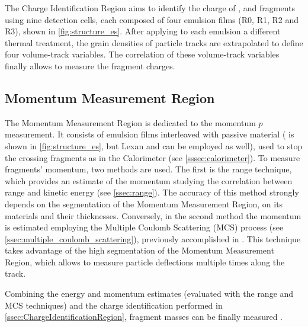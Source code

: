 The Charge Identification Region aims to identify the charge of ,  and  fragments using nine detection cells, each composed of four emulsion films (R0, R1, R2 and R3), shown in \autoref{fig:structure_es}. After applying to each emulsion a different thermal treatment, the grain densities of particle tracks are extrapolated to define four volume-track variables. The correlation of these volume-track variables finally allows to measure the fragment charges.
\subsection{Momentum Measurement Region}\label{ssec:MomentumMeasurementRegion}
The Momentum Measurement Region is dedicated to the momentum $p$ measurement. It consists of emulsion films interleaved with passive material ( is shown in \autoref{fig:structure_es}, but Lexan and  can be employed as well), used to stop the crossing fragments as in the Calorimeter (see \autoref{sssec:calorimeter}). To measure fragments' momentum, two methods are used. The first is the range technique, which provides an estimate of the momentum studying the correlation between range and kinetic energy (see \autoref{ssec:range}). The accuracy of this method strongly depends on the segmentation of the Momentum Measurement Region, on its materials and their thicknesses. Conversely, in the second method the momentum is estimated employing the Multiple Coulomb Scattering (MCS) process (see \autoref{ssec:multiple_coulomb_scattering}), previously accomplished in \cite{Agafonova_2012,DESERIO2003539}. This technique takes advantage of the high segmentation of the Momentum Measurement Region, which allows to measure particle deflections multiple times along the track.

Combining the energy and momentum estimates (evaluated with the range and MCS techniques) and the charge identification performed in \autoref{ssec:ChargeIdentificationRegion}, fragment masses can be finally measured \cite{measurement_impact_foot}.
